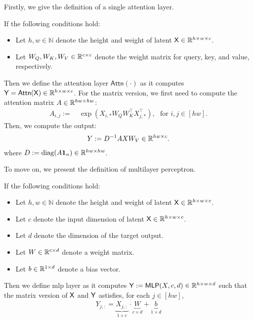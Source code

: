 Firstly, we give the definition of a single attention layer.
\begin{definition}\label{def:attn_layer}
    If the following conditions hold:
    \begin{itemize}
        \item Let $h,w \in \mathbb{N}$ denote the height and weight of latent $\mathsf{X} \in \mathbb{R}^{h \times w \times c}$.
        \item Let $W_Q, W_K, W_V \in \mathbb{R}^{c \times c}$ denote the weight matrix for query, key, and value, respectively.
    \end{itemize}
    Then we define the attention layer $\mathsf{Attn}(\cdot)$ as it computes  $\mathsf{Y} = \mathsf{Attn}(\mathsf{X}) \in \mathbb{R}^{h \times w \times c}$. For the matrix version, we first need to compute the attention matrix $A \in \mathbb{R}^{hw \times hw}$:
    \begin{align*}
        A_{i,j} := & ~\exp(  X_{i,*}   W_Q   W_K^\top   X_{j,*}^\top), \text{~~for~} i, j \in [hw].
    \end{align*}
    Then, we compute the output:
    \begin{align*}
        Y := D^{-1}AXW_V \in \mathbb{R}^{hw \times c}.
    \end{align*}
    where $D:=\operatorname{diag}(A {\bf 1}_n) \in \mathbb{R}^{hw \times hw}$.
\end{definition}


To move on, we present the definition of multilayer perceptron.
\begin{definition}\label{def:mlp}
    If the following conditions hold:
    \begin{itemize}
        \item Let $h,w \in \mathbb{N}$ denote the height and weight of latent $\mathsf{X} \in \mathbb{R}^{h \times w \times c}$.
        \item Let $c$ denote the input dimension of latent $\mathsf{X} \in \mathbb{R}^{h \times w \times c}$.
        \item Let $d$ denote the dimension of the target output.
        \item Let $W \in \mathbb{R}^{c \times d}$ denote a weight matrix.
        \item Let $b \in \mathbb{R}^{1 \times d}$ denote a bias vector.
    \end{itemize}
    Then we define mlp layer as it computes $\mathsf{Y} := \mathsf{MLP}(X,c,d) \in \mathbb{R}^{h \times w \times d}$ such that the matrix version of $\mathsf{X}$ and $\mathsf{Y}$ astisfies, for each $j \in [hw]$,
    \begin{align*}
        Y_{j,:} = \underbrace{X_{j,:}}_{1\times c} \cdot \underbrace{W}_{c \times d} + \underbrace{b}_{1 \times d}
    \end{align*}
\end{definition}




